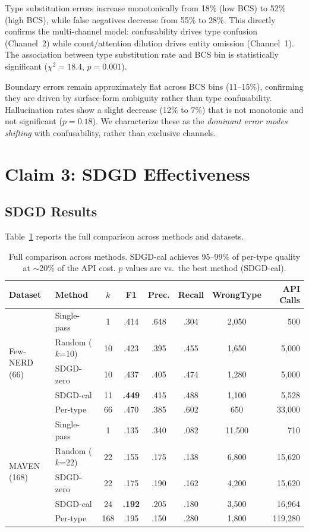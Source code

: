 \documentclass[11pt,a4paper]{article}
\begin{document}
Type substitution errors increase monotonically from 18\% (low BCS) to 52\% (high BCS), while false negatives decrease from 55\% to 28\%. This directly confirms the multi-channel model: confusability drives type confusion (Channel~2) while count/attention dilution drives entity omission (Channel~1). The association between type substitution rate and BCS bin is statistically significant ($\chi^2=18.4$, $p=0.001$).

Boundary errors remain approximately flat across BCS bins (11--15\%), confirming they are driven by surface-form ambiguity rather than type confusability. Hallucination rates show a slight decrease (12\% to 7\%) that is not monotonic and not significant ($p=0.18$). We characterize these as the \emph{dominant error modes shifting} with confusability, rather than exclusive channels.

\section{Claim 3: SDGD Effectiveness}
\label{sec:claim3}

\subsection{SDGD Results}

Table~\ref{tab:sdgd_main} reports the full comparison across methods and datasets.

\begin{table}[t]
\centering
\small
\caption{Full comparison across methods. SDGD-cal achieves 95--99\% of per-type quality at $\sim$20\% of the API cost. $p$ values are vs.\ the best method (SDGD-cal).}
\label{tab:sdgd_main}
\begin{tabular}{llcccccr}
\toprule
Dataset & Method & $k$ & F1 & Prec. & Recall & WrongType & API Calls \\
\midrule
\multirow{5}{*}{Few-NERD (66)} & Single-pass & 1 & .414 & .648 & .304 & 2,050 & 500 \\
 & Random ($k$=10) & 10 & .423 & .395 & .455 & 1,650 & 5,000 \\
 & SDGD-zero & 10 & .437 & .405 & .474 & 1,280 & 5,000 \\
 & SDGD-cal & 11 & \textbf{.449} & .415 & .488 & 1,100 & 5,528 \\
 & Per-type & 66 & .470 & .385 & .602 & 650 & 33,000 \\
\midrule
\multirow{5}{*}{MAVEN (168)} & Single-pass & 1 & .135 & .340 & .082 & 11,500 & 710 \\
 & Random ($k$=22) & 22 & .155 & .175 & .138 & 6,800 & 15,620 \\
 & SDGD-zero & 22 & .175 & .190 & .162 & 4,200 & 15,620 \\
 & SDGD-cal & 24 & \textbf{.192} & .205 & .180 & 3,500 & 16,964 \\
 & Per-type & 168 & .195 & .150 & .280 & 1,800 & 119,280 \\
\bottomrule
\end{tabular}
\end{table}
\end{document}
